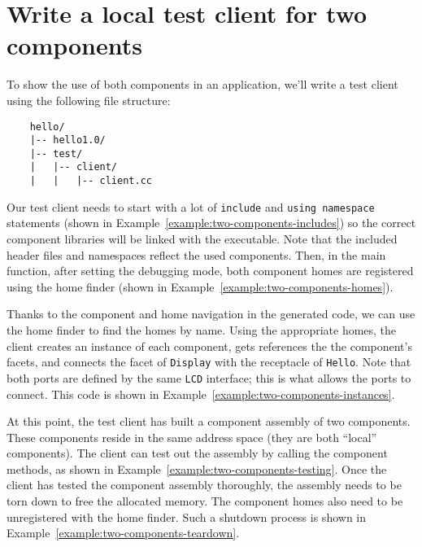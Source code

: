 \section{Write a local test client for two components}

To show the use of both components in an application, we'll write a test client
using the following file structure:
\begin{small}
\begin{verbatim}
    hello/
    |-- hello1.0/
    |-- test/
    |   |-- client/
    |   |   |-- client.cc
\end{verbatim}
\end{small}

Our test client needs to start with a lot of {\tt include} and {\tt using
namespace} statements (shown in Example~\ref{example:two-components-includes})
so the correct component libraries will be linked with the executable. Note that
the included header files and namespaces reflect the used components. Then, in
the main function, after setting the debugging mode, both component homes are
registered using the home finder (shown in
Example~\ref{example:two-components-homes}).

Thanks to the component and home navigation in the generated code, we can use
the home finder to find the homes by name. Using the appropriate homes, the
client creates an instance of each component, gets references the the
component's facets, and connects the facet of {\tt Display} with the receptacle
of {\tt Hello}. Note that both ports are defined by the same {\tt LCD}
interface; this is what allows the ports to connect. This code is shown in
Example~\ref{example:two-components-instances}.

At this point, the test client has built a component assembly of two components.
These components reside in the same address space (they are both ``local''
components). The client can test out the assembly by calling the component
methods, as shown in Example~\ref{example:two-components-testing}. Once the
client has tested the component assembly thoroughly, the assembly needs to be
torn down to free the allocated memory. The component homes also need to be
unregistered with the home finder. Such a shutdown process is shown in
Example~\ref{example:two-components-teardown}.

